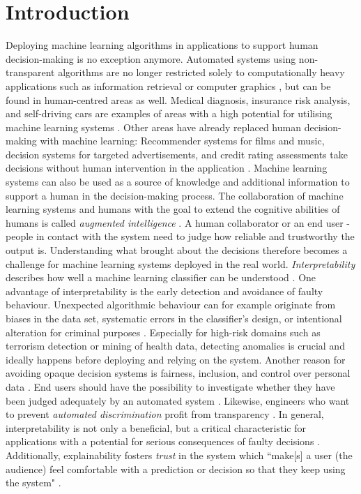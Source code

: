 \section{Introduction}
Deploying machine learning algorithms in applications to support human decision-making is no exception anymore. Automated systems using non-transparent algorithms are no longer restricted solely to computationally heavy applications such as information retrieval or computer graphics \cite{liu2017towards}, but can be found in human-centred areas as well. Medical diagnosis, insurance risk analysis, and self-driving cars are examples of areas with a high potential for utilising machine learning systems \cite{guidotti2018survey}. Other areas have already replaced human decision-making with machine learning: Recommender systems for films and music, decision systems for targeted advertisements, and credit rating assessments take decisions without human intervention in the application \cite{gilpin2018explaining}. Machine learning systems can also be used as a source of knowledge and additional information to support a human in the decision-making process. The collaboration of machine learning systems and humans with the goal to extend the cognitive abilities of humans is called \textit{augmented intelligence} \cite{ventocilla2018taxonomy}.\newline
A human collaborator or an end user - people in contact with the system need to judge how reliable and trustworthy the output is. Understanding what brought about the decisions therefore becomes a challenge for machine learning systems deployed in the real world. \textit{Interpretability} describes how well a machine learning classifier can be understood \cite{kotsiantis2007supervised}. One advantage of interpretability is the early detection and avoidance of faulty behaviour. Unexpected algorithmic behaviour can for example originate from biases in the data set, systematic errors in the classifier's design, or intentional alteration for criminal purposes \cite{gilpin2018explaining}. Especially for high-risk domains such as terrorism detection or mining of health data, detecting anomalies is crucial \cite{ribeiro2016should} and ideally happens before deploying and relying on the system. Another reason for avoiding opaque decision systems is fairness, inclusion, and control over personal data \cite{diakopoulos2016accountability, gilpin2018explaining, goodman16eu}. End users should have the possibility to investigate whether they have been judged adequately by an automated system \cite{selbst2017meaningful}. Likewise, engineers who want to prevent \textit{automated discrimination} profit from transparency \cite{ribeiro2016should, richardson2018survey}. In general, interpretability is not only a beneficial, but a critical characteristic for applications with a potential for serious consequences of faulty decisions \cite{richardson2018survey}. Additionally, explainability fosters \textit{trust} in the system  \cite{biran2017explanation, cramer2008effects, diakopoulos2016accountability, preece2018asking, vorm2018assessing} which ``make[s] a user (the audience) feel comfortable with a prediction or decision so that they keep using the system" \cite{van2001perceived}.\newline
